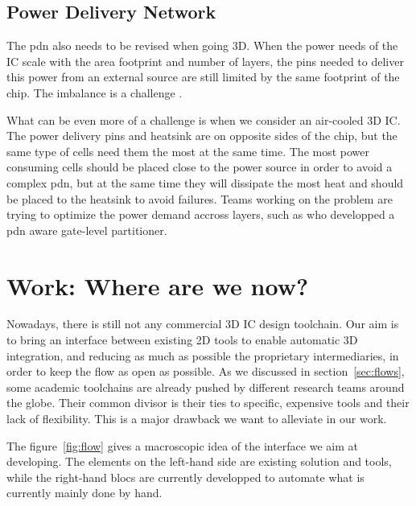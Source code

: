 \documentclass[11pt,a4paper]{report} %
\theoremstyle{customdef}
\begin{document}
\section{Power Delivery Network}
The \gls{pdn} also needs to be revised when going 3D.
When the power needs of the IC scale with the area footprint and number of layers, the pins needed to deliver this power from an external source are still limited by the same footprint of the chip.
The imbalance is a challenge \citep{Jain2008}.

What can be even more of a challenge is when we consider an air-cooled 3D IC.
The power delivery pins and heatsink are on opposite sides of the chip, but the same type of cells need them the most at the same time.
The most power consuming cells should be placed close to the power source in order to avoid a complex \gls{pdn}, but at the same time they will dissipate the most heat and should be placed to the heatsink to avoid failures.
Teams working on the problem are trying to optimize the power demand accross layers, such as \citet{Pantht2015} who developped a \gls{pdn} aware gate-level  partitioner.




\chapter{Work: Where are we now?}\label{sec:work}\label{chap:work}
Nowadays, there is still not any commercial 3D IC design toolchain.
Our aim is to bring an interface between existing 2D tools to enable automatic 3D integration, and reducing as much as possible the proprietary intermediaries, in order to keep the flow as open as possible.
As we discussed in section~\ref{sec:flows}, some academic toolchains are already pushed by different research teams around the globe.
Their common divisor is their ties to specific, expensive tools and their lack of flexibility.
This is a major drawback we want to alleviate in our work.

The figure~\ref{fig:flow} gives a macroscopic idea of the interface we aim at developing.
The elements on the left-hand side are existing solution and tools, while the right-hand blocs are currently developped to automate what is currently mainly done by hand.
\end{document}
